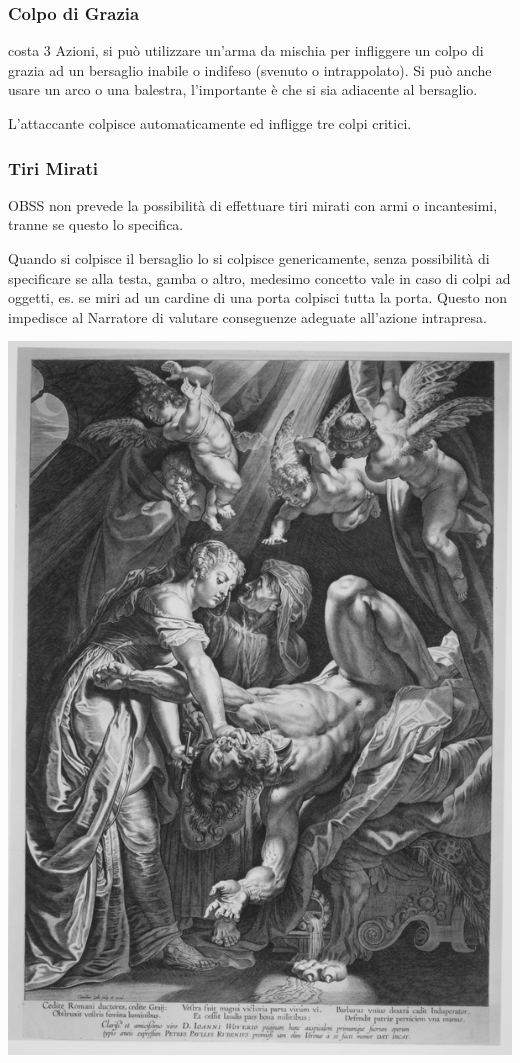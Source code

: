 \begin{multicols}{2}
\subsubsection{Colpo di Grazia} \label{colpodigrazia}

costa 3 Azioni, si può utilizzare un'arma da mischia per infliggere un colpo di grazia ad un bersaglio inabile o indifeso (svenuto o intrappolato). Si può anche usare un arco o una balestra, l'importante è che si sia adiacente al bersaglio.

L'attaccante colpisce automaticamente ed infligge tre colpi critici.

\subsubsection{Tiri Mirati}\label{tirimirati}

OBSS non prevede la possibilità di effettuare tiri mirati con armi o incantesimi, tranne se questo lo specifica.

Quando si colpisce il bersaglio lo si colpisce genericamente, senza possibilità di specificare se alla testa, gamba o altro, medesimo concetto vale in caso di colpi ad oggetti, es. se miri ad un cardine di una porta colpisci tutta la porta. Questo non impedisce al Narratore di valutare conseguenze adeguate all'azione intrapresa.

\medskip

\begin{center}
	\includegraphics[width=0.6\linewidth]{immagini/Judith_Beheading_Holofernes_MET_MM27116.png}


\end{center}
\end{multicols}
